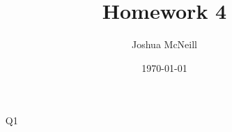 \documentclass{article}
\title{Homework 4}
\author{Joshua McNeill}
\date{\today}
\begin{document}
  \maketitle
  \begin{itemize}
    \item[Q1] 
  \end{itemize}
\end{document}
